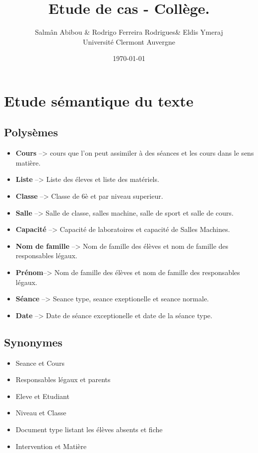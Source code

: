 \documentclass[12pt,french,titlepage]{article}
\title{Etude de cas - Collège.}
\author{Salmân Abibou \& Rodrigo Ferreira Rodrigues\& Eldis Ymeraj \\ \hline
Université Clermont Auvergne\\ \hline}
\date{\today}
\begin{document}
	\maketitle


	\tableofcontents
	\newpage
	
	\section{Etude sémantique du texte}
	
	\subsection{Polysèmes}
	
	\begin{itemize}
	    \item \textbf{Cours}          --> cours que l'on peut assimiler à des séances et les cours dans le sens matière.
	    \item  \textbf{Liste}          --> Liste des éleves et liste des matériels.
	    \item \textbf{Classe}  --> Classe de 6è et par niveau superieur.
	    \item \textbf{Salle} --> Salle de classe, salles machine, salle de sport et salle de cours.
	    \item \textbf{Capacité} --> Capacité de laboratoires et capacité de Salles Machines.
	    \item \textbf{Nom de famille} --> Nom de famille des élèves et nom de famille des responsables légaux.	
	    \item \textbf{Prénom}--> Nom de famille des élèves et nom de famille des responsables légaux.
	    \item \textbf{Séance} --> Seance type, seance exeptionelle et seance normale.
	    \item \textbf{Date} --> Date de séance exceptionelle et date de la séance type.
	  \end{itemize}
	  
	  \subsection{Synonymes}
	  
	  \begin{itemize}
	      \item Seance et Cours
	      \item Responsables légaux et parents
	      \item Eleve et Etudiant
	      \item Niveau et Classe
	      \item Document type listant les élèves absents  et fiche
	      \item Intervention et Matière
	  \end{itemize}
	  
\end{document}
